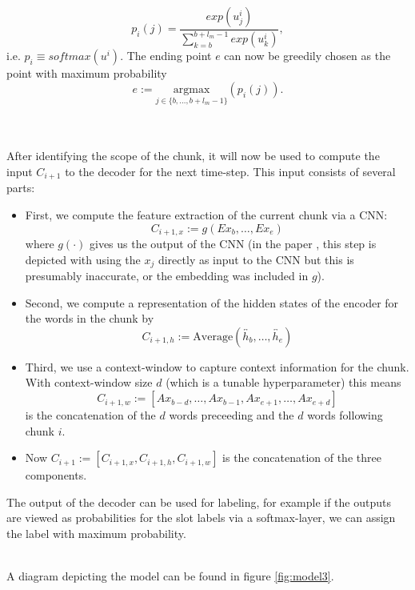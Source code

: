 \documentclass[twoside,11pt,a4paper]{article}
\theoremstyle{break}
\begin{document}
\[
	p_i(j) = \frac{exp(u_j^i)}{\sum_{k=b}^{b+l_m-1} exp(u_k^i)},
\]
i.e. $p_i \equiv softmax(u^i)$. The ending point $e$ can now be greedily chosen as the point with maximum probability
\[
	e := \underset{j \in \lbrace b, \dots, b+l_m-1 \rbrace}{\text{argmax}} (p_i(j)).
\]\\
\ \par
After identifying the scope of the chunk, it will now be used to compute the input $C_{i+1}$ to the decoder for the next time-step. This input consists of several parts:

\begin{itemize}
	\item First, we compute the feature extraction of the current chunk via a CNN:
		\[
			C_{i+1,x} := g(E x_b, \dots, E x_e) 
		\]
		where $g(\cdot)$ gives us the output of the CNN (in the paper \cite{zhai:2017}, this step is depicted with using the $x_j$ directly as input to the CNN but this is presumably inaccurate, or the embedding was included in $g$).
	\item Second, we compute a representation of the hidden states of the encoder for the words in the chunk by
		\[
			C_{i+1,h} := \text{Average}(\overleftrightarrow{h_b}, \dots, \overleftrightarrow{h_e})
		\]
	\item Third, we use a context-window to capture context information for the chunk. With context-window size $d$ (which is a tunable hyperparameter) this means
		\[
			C_{i+1,w} := [ A x_{b-d}, \dots, A x_{b-1}, A x_{e+1}, \dots, A x_{e+d}]
		\]
		is the concatenation of the $d$ words preceeding and the $d$ words following chunk $i$.
	\item Now $C_{i+1} := [C_{i+1,x}, C_{i+1,h}, C_{i+1,w}]$ is the concatenation of the three components.
\end{itemize}
The output of the decoder can be used for labeling, for example if the outputs are viewed as probabilities for the slot labels via a softmax-layer, we can assign the label with maximum probability.\\
\ \par
A diagram depicting the model can be found in figure \ref{fig:model3}.
\end{document}
